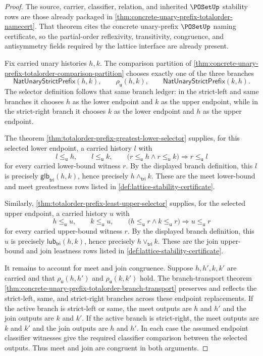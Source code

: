 \begin{proof}
The source, carrier, classifier, relation, and inherited $\POSetUp$ stability rows are those already packaged in \autoref{thm:concrete-unary-prefix-totalorder-namecert}. That theorem cites the concrete unary-prefix $\POSetUp$ naming certificate, so the partial-order reflexivity, transitivity, congruence, and antisymmetry fields required by the lattice interface are already present.

Fix carried unary histories $h,k$. The comparison partition of \autoref{thm:concrete-unary-prefix-totalorder-comparison-partition} chooses exactly one of the three branches
$$
\mathsf{NatUnaryStrictPrefix}(h,k),
\qquad
\rho_{\mathsf{u}}(h,k),
\qquad
\mathsf{NatUnaryStrictPrefix}(k,h).
$$
The selector definition follows that same branch ledger: in the strict-left and same branches it chooses $h$ as the lower endpoint and $k$ as the upper endpoint, while in the strict-right branch it chooses $k$ as the lower endpoint and $h$ as the upper endpoint.

The theorem \autoref{thm:totalorder-prefix-greatest-lower-selector} supplies, for this selected lower endpoint, a carried history $l$ with
$$
l\le_{\mathsf{u}}h,
\qquad
l\le_{\mathsf{u}}k,
\qquad
\bigl(r\le_{\mathsf{u}}h\land r\le_{\mathsf{u}}k\bigr)\Rightarrow r\le_{\mathsf{u}}l
$$
for every carried lower-bound witness $r$. By the displayed branch definition, this $l$ is precisely $\mathsf{glb}_{\mathsf{tri}}(h,k)$, hence precisely $h\wedge_{\mathsf{tri}}k$. These are the meet lower-bound and meet greatestness rows listed in \autoref{def:lattice-stability-certificate}.

Similarly, \autoref{thm:totalorder-prefix-least-upper-selector} supplies, for the selected upper endpoint, a carried history $u$ with
$$
h\le_{\mathsf{u}}u,
\qquad
k\le_{\mathsf{u}}u,
\qquad
\bigl(h\le_{\mathsf{u}}r\land k\le_{\mathsf{u}}r\bigr)\Rightarrow u\le_{\mathsf{u}}r
$$
for every carried upper-bound witness $r$. By the displayed branch definition, this $u$ is precisely $\mathsf{lub}_{\mathsf{tri}}(h,k)$, hence precisely $h\vee_{\mathsf{tri}}k$. These are the join upper-bound and join leastness rows listed in \autoref{def:lattice-stability-certificate}.

It remains to account for meet and join congruence. Suppose $h,h',k,k'$ are carried and that $\rho_{\mathsf{u}}(h,h')$ and $\rho_{\mathsf{u}}(k,k')$ hold. The branch-transport theorem \autoref{thm:concrete-unary-prefix-totalorder-branch-transport} preserves and reflects the strict-left, same, and strict-right branches across these endpoint replacements. If the active branch is strict-left or same, the meet outputs are $h$ and $h'$ and the join outputs are $k$ and $k'$. If the active branch is strict-right, the meet outputs are $k$ and $k'$ and the join outputs are $h$ and $h'$. In each case the assumed endpoint classifier witnesses give the required classifier comparison between the selected outputs. Thus meet and join are congruent in both arguments.


\end{proof}
